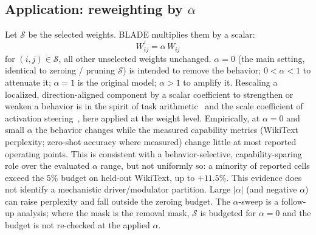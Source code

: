 \subsection{Application: reweighting by $\alpha$}
\label{sec:apply}
Let $\mathcal{S}$ be the selected weights. BLADE multiplies them by a scalar: 
\begin{equation}
  W^{\prime}_{ij}=\alpha\,W_{ij}
\end{equation}
for $(i,j)\in\mathcal{S}$, all other unselected weights unchanged. $\alpha=0$ (the main setting, identical to zeroing / pruning $\mathcal{S}$) is intended to remove the behavior; $0<\alpha<1$ to attenuate it; $\alpha=1$ is the original model; $\alpha>1$ to amplify it. Rescaling a localized, direction-aligned component by a scalar coefficient to strengthen or weaken a behavior is in the spirit of task arithmetic~\cite{ilharco2023task} and the scale coefficient of activation steering~\cite{rimsky2024caa}, here applied at the weight level. Empirically, at $\alpha=0$ and small $\alpha$ the behavior changes while the measured capability metrics (WikiText perplexity; zero-shot accuracy where measured) change little at most reported operating points. This is consistent with a behavior-selective, capability-sparing role over the evaluated $\alpha$ range, but not uniformly so: a minority of reported cells exceed the $5\%$ budget on held-out WikiText, up to $+11.5\%$. This evidence does not identify a mechanistic driver/modulator partition. Large $\lvert\alpha\rvert$ (and negative $\alpha$) can raise perplexity and fall outside the zeroing budget. The $\alpha$-sweep is a follow-up analysis; where the mask is the removal mask, $\mathcal{S}$ is budgeted for $\alpha=0$ and the budget is not re-checked at the applied $\alpha$.

